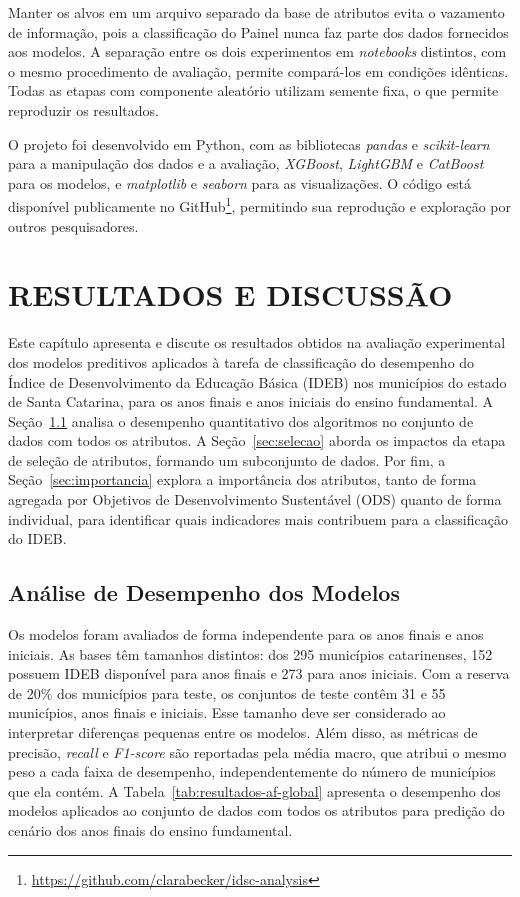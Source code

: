 Manter os alvos em um arquivo separado da base de atributos evita o vazamento de informação, pois a classificação do Painel nunca faz parte dos dados fornecidos aos modelos. A separação entre os dois experimentos em \textit{notebooks} distintos, com o mesmo procedimento de avaliação, permite compará-los em condições idênticas. Todas as etapas com componente aleatório utilizam semente fixa, o que permite reproduzir os resultados.

O projeto foi desenvolvido em Python, com as bibliotecas \textit{pandas} e \textit{scikit-learn} para a manipulação dos dados e a avaliação, \textit{XGBoost}, \textit{LightGBM} e \textit{CatBoost} para os modelos, e \textit{matplotlib} e \textit{seaborn} para as visualizações. O código está disponível publicamente no GitHub\footnote{\url{https://github.com/clarabecker/idsc-analysis}}, permitindo sua reprodução e exploração por outros pesquisadores.

\chapter{RESULTADOS E DISCUSSÃO}

Este capítulo apresenta e discute os resultados obtidos na avaliação experimental dos modelos preditivos aplicados à tarefa de classificação do desempenho do Índice de Desenvolvimento da Educação Básica (IDEB) nos municípios do estado de Santa Catarina, para os anos finais e anos iniciais do ensino fundamental. A Seção~\ref{sec:desempenho} analisa o desempenho quantitativo dos algoritmos no conjunto de dados com todos os atributos. A Seção~\ref{sec:selecao} aborda os impactos da etapa de seleção de atributos, formando um subconjunto de dados. Por fim, a Seção~\ref{sec:importancia} explora a importância dos atributos, tanto de forma agregada por Objetivos de Desenvolvimento Sustentável (ODS) quanto de forma individual, para identificar quais indicadores mais contribuem para a classificação do IDEB.

\section{Análise de Desempenho dos Modelos}
\label{sec:desempenho}

Os modelos foram avaliados de forma independente para os anos finais e anos iniciais. As bases têm tamanhos distintos: dos 295 municípios catarinenses, 152 possuem IDEB disponível para anos finais e 273 para anos iniciais. Com a reserva de 20\% dos municípios para teste, os conjuntos de teste contêm 31 e 55 municípios, anos finais e iniciais. Esse tamanho deve ser considerado ao interpretar diferenças pequenas entre os modelos. Além disso, as métricas de precisão, \textit{recall} e \textit{F1-score} são reportadas pela média macro, que atribui o mesmo peso a cada faixa de desempenho, independentemente do número de municípios que ela contém. A Tabela~\ref{tab:resultados-af-global} apresenta o desempenho dos modelos aplicados ao conjunto de dados com todos os atributos para predição do cenário dos anos finais do ensino fundamental.

